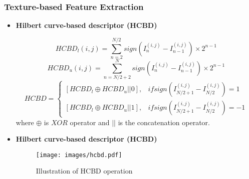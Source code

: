 \subsubsection{Texture-based Feature Extraction}
\begin{frame}[t]{\subsubsecname}
	\topline
    \begin{itemize}
    	\item \textcolor{navy_theme}{\textbf{Hilbert curve-based descriptor (HCBD) \cite{Ebrahim2009hcbd}}}
				
		\begin{equation}\label{eq17}
			HCBD_{l}(i,j)=\sum_{n=2}^{N/2}sign(I_{n}^{(i,j)}-I_{n-1}^{(i,j)})\times 2^{n-1}
		\end{equation}
		\begin{equation}\label{eq18}
			HCBD_{u}(i,j)=\sum_{n=N/2+2}^{N}sign(I_{n}^{(i,j)}-I_{n-1}^{(i,j)})\times 2^{n-1}
		\end{equation}
		\begin{equation}\label{eq19}
			HCBD=\left\{\begin{matrix}
				[HCBD_{l} \oplus  HCBD_{u} || 0] , & if sign(I_{N/2+1}^{(i,j)}-I_{N/2}^{(i,j)})=1   \\
				[HCBD_{l} \oplus  HCBD_{u} || 1],  & if  sign(I_{N/2+1}^{(i,j)}-I_{N/2}^{(i,j)})=-1
			\end{matrix}\right.
		\end{equation}
		where $\oplus$ is $XOR$ operator and $||$ is the concatenation operator.
	\end{itemize}
\end{frame}

\begin{frame}[t]{\subsubsecname}
	\topline
    \begin{itemize}
    	\item \textcolor{navy_theme}{\textbf{Hilbert curve-based descriptor (HCBD) \cite{Ebrahim2009hcbd}}}
    	\vspace{1em}
		\begin{figure}[!ht]
			\centering
			\texttt{[image: images/hcbd.pdf]}
			\caption{Illustration of HCBD operation}
			\label{HCBD1}
		\end{figure}
		
	\end{itemize}
\end{frame}

